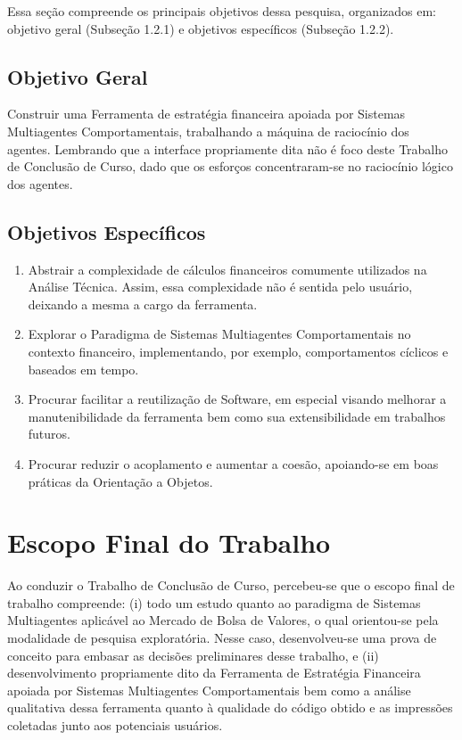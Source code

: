 Essa seção compreende os principais objetivos dessa pesquisa, organizados em: objetivo geral (Subseção 1.2.1) e objetivos específicos (Subseção 1.2.2).


\subsection {Objetivo Geral}

Construir uma Ferramenta de estratégia financeira apoiada por Sistemas Multiagentes Comportamentais, trabalhando a máquina de raciocínio dos agentes. Lembrando que a interface propriamente dita não é foco deste Trabalho de Conclusão de Curso, dado que os esforços  concentraram-se no raciocínio lógico dos agentes.


\subsection {Objetivos Específicos}

\begin{enumerate}
\item Abstrair a complexidade de cálculos financeiros comumente utilizados na Análise Técnica. Assim, essa complexidade não é sentida pelo usuário, deixando a mesma a cargo da ferramenta.
\item Explorar o Paradigma de Sistemas Multiagentes Comportamentais no contexto financeiro, implementando, por exemplo, comportamentos cíclicos e baseados em tempo.
\item Procurar facilitar a reutilização de Software, em especial visando melhorar a manutenibilidade da ferramenta bem como sua extensibilidade em trabalhos futuros.
\item Procurar reduzir o acoplamento e aumentar a coesão, apoiando-se em boas práticas da Orientação a Objetos.
\end{enumerate}

\section{Escopo Final do Trabalho}

Ao conduzir o Trabalho de Conclusão de Curso, percebeu-se que o escopo final de trabalho compreende: (i) todo um estudo quanto ao paradigma de Sistemas Multiagentes aplicável ao Mercado de Bolsa de Valores, o qual orientou-se pela modalidade de pesquisa exploratória. Nesse caso, desenvolveu-se uma prova de conceito para embasar as decisões preliminares desse trabalho, e (ii) desenvolvimento propriamente dito da Ferramenta de Estratégia Financeira apoiada por Sistemas Multiagentes Comportamentais bem como a análise qualitativa dessa ferramenta quanto à qualidade do código obtido e as impressões coletadas junto aos potenciais usuários. 

